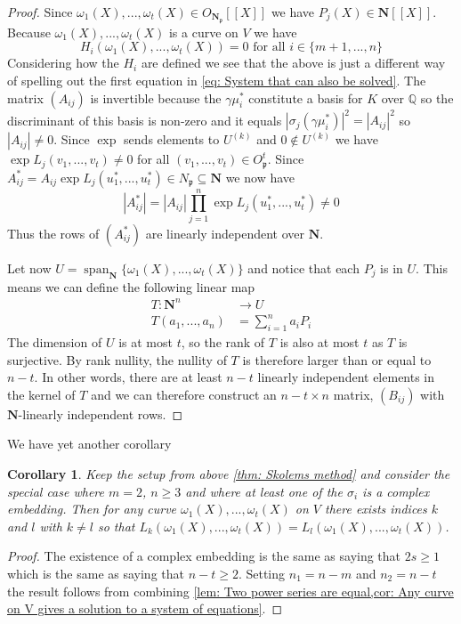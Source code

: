 \documentclass{article}
\newcommand{\Span}{\operatorname{span}}
\newtheorem{corollary}{Corollary}[section]
\newcommand{\mfrak}[1]{\mathfrak{#1}}
\newcommand{\mbb}[1]{\mathbb{#1}}
\numberwithin{equation}{section}
\begin{document}
\begin{proof}
    Since $\omega_1(X), ..., \omega_t(X) \in O_{\bm {N_{\mfrak p}}}[[X]]$ we have $P_j(X) \in \bm N[[X]]$. Because $\omega_1(X), ..., \omega_t(X)$ is a curve on $V$ we have
    \begin{equation}\label{eq: Last reformulation of initial equations}
        H_i(\omega_1(X), ..., \omega_t(X)) = 0 \text{ for all } i \in \{m+1, ..., n\}
    \end{equation}
    Considering how the $H_i$ are defined we see that the above is just a different way of spelling out the first equation in \cref{eq: System that can also be solved}. The matrix $(A_{ij})$ is invertible because the $\gamma \mu_i^*$ constitute a basis for $K$ over $\mbb{Q}$ so the discriminant of this basis is non-zero and it equals $|\sigma_j(\gamma \mu_i^*)|^2 = |A_{ij}|^2$ so $|A_{ij}| \neq 0$. Since $\exp$ sends elements to $U^{(k)}$ and $0 \notin U^{(k)}$ we have $\exp L_j(v_1, ..., v_t) \neq 0$ for all $(v_1, ..., v_t) \in O_\mfrak p^t$. Since $A_{ij}^* = A_{ij} \exp L_j(u_1^*, ..., u_t^*) \in N_\mfrak p \subseteq \bm N$ we now have
    $$|A_{ij}^*| = |A_{ij}| \prod_{j = 1}^n \exp L_j(u_1^*, ..., u_t^*) \neq 0$$
    Thus the rows of $(A_{ij}^*)$ are linearly independent over $\bm N$. 
    
    Let now $U = \Span_{\bm N} \{ \omega_1(X), ..., \omega_t(X) \}$ and notice that each $P_j$ is in $U$. This means we can define the following linear map
    \begin{align*}
        T : \bm N^n  & \to U                    \\
        T(a_1, ..., a_n) & = \sum_{i = 1}^n a_i P_i
    \end{align*}
    The dimension of $U$ is at most $t$, so the rank of $T$ is also at most $t$ as $T$ is surjective. By rank nullity, the nullity of $T$ is therefore larger than or equal to $n-t$. In other words, there are at least $n-t$ linearly independent elements in the kernel of $T$ and we can therefore construct an $n-t \times n$ matrix, $(B_{ij})$ with $\bm N$-linearly independent rows.
\end{proof}

We have yet another corollary
\begin{corollary}\label{cor: Result to prove thues theorem}
    Keep the setup from above \cref{thm: Skolems method} and consider the special case where $m = 2$, $n \geq 3$ and where at least one of the $\sigma_i$ is a complex embedding. Then for any curve $\omega_1(X), ..., \omega_t(X)$ on $V$ there exists indices $k$ and $l$ with $k \neq l$ so that $L_k(\omega_1(X), ..., \omega_t(X)) = L_l(\omega_1(X), ..., \omega_t(X))$.
\end{corollary}
\begin{proof}
    The existence of a complex embedding is the same as saying that $2s \geq 1$ which is the same as saying that $n - t \geq 2$. Setting $n_1 = n-m$ and $n_2 = n-t$ the result follows from combining \cref{lem: Two power series are equal,cor: Any curve on V gives a solution to a system of equations}.
\end{proof}
\end{document}
